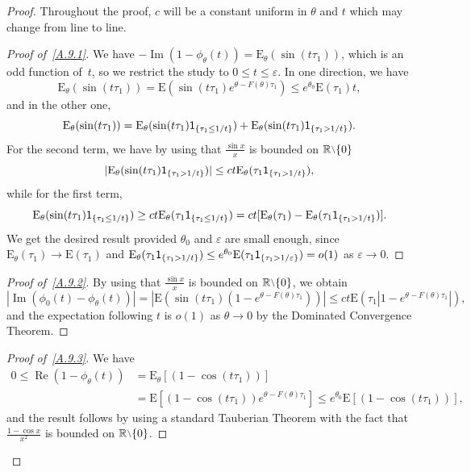 \documentclass[11pt]{article}
\theoremstyle{definition}
\numberwithin{equation}{section}
\numberwithin{figure}{section}
\numberwithin{table}{section}
\DeclareMathOperator{\re}{Re}
\DeclareMathOperator{\im}{Im}
\newcommand{\bbR}{{\ensuremath{\mathbb R}}}
\newcommand{\gep}{\varepsilon}
\newcommand{\gt}{\theta}
\newcommand\bE{\ensuremath{\mathrm{E}}}
\newcommand{\ind}{{\sf 1}}
\newcommand{\sm}{{\raise0.3ex\hbox{$\scriptstyle \setminus$}}}
\newenvironment{step}[1]{\begin{proof}[#1]}{\let\qed\relax \end{proof}}
\begin{document}
\begin{proof}
Throughout the proof, $c$ will be a constant uniform in $\gt$ and $t$ which may change from line to line.

\begin{step}{Proof of~\eqref{A.9.1}}
We have $-\im(1- \phi_\gt(t)) = \bE_\gt (\sin(t\tau_1))$, which is an odd function of~$t$, so we restrict the study to $0\le t\le \gep$. In one direction, we have
\begin{equation}
\bE_\gt (\sin(t\tau_1)) = \bE(\sin(t\tau_1)e^{\gt - F(\gt)\tau_1}) \le e^{\gt_0}\bE(\tau_1) t,
\end{equation}
and in the other one,
\begin{equation}
\bE_\gt (\sin(t\tau_1)) = \bE_\gt (\sin(t\tau_1)\ind_{\{\tau_1 \le 1/t\}}) + \bE_\gt (\sin(t\tau_1)\ind_{\{\tau_1 > 1/t\}}).
\end{equation}
For the second term, we have by using that $\frac{\sin x}{x}$ is bounded on $\bbR\sm\{0\}$
\begin{equation}
|\bE_\gt (\sin(t\tau_1)\ind_{\{\tau_1 > 1/t\}})| \le ct\bE_\gt(\tau_1 \ind_{\{\tau_1 > 1/t\}}),
\end{equation}
while for the first term,
\begin{equation}
\bE_\gt (\sin(t\tau_1)\ind_{\{\tau_1 \le 1/t\}}) \ge ct \bE_\gt(\tau_1 \ind_{\{\tau_1 \le 1/t\}}) = ct [\bE_\gt(\tau_1) - \bE_\gt(\tau_1 \ind_{\{\tau_1 > 1/t\}})].
\end{equation}
We get the desired result provided $\gt_0$ and $\gep$ are small enough, since $\bE_\gt(\tau_1) \to \bE(\tau_1)$ and $\bE_\gt(\tau_1 \ind_{\{\tau_1 > 1/t\}}) \le e^{\gt_0} \bE(\tau_1 \ind_{\{\tau_1 > 1/\gep\}}) = o(1)$ as $\gep\to 0$.
\end{step}

\begin{step}{Proof of~\eqref{A.9.2}}
By using that $\frac{\sin x}{x}$ is bounded on $\bbR\sm\{0\}$, we obtain
\begin{equation}
|{\im(\phi_0(t) -\phi_\gt(t))}| = | \bE(\sin(t\tau_1) (1-e^{\gt - F(\gt)\tau_1})) | \le ct \bE(\tau_1|1-e^{\gt - F(\gt)\tau_1}|),
\end{equation} and the expectation following $t$ is $o(1)$ as $\gt\to 0$ by the Dominated Convergence Theorem.
\end{step}

\begin{step}{Proof of~\eqref{A.9.3}}
We have
\begin{equation}
\begin{aligned}
0 \le \re(1- \phi_\gt(t)) &= \bE_\gt[(1-\cos(t\tau_1))]\\
&= \bE[(1-\cos(t\tau_1))e^{\gt-F(\gt)\tau_1}] \le e^{\gt_0} \bE[(1-\cos(t\tau_1))],
\end{aligned}
\end{equation} and the result follows by using a standard Tauberian Theorem with the fact that $\frac{1-\cos x}{x^2}$ is bounded on $\bbR\sm\{0\}$.
\end{step}


\end{proof}
\end{document}
